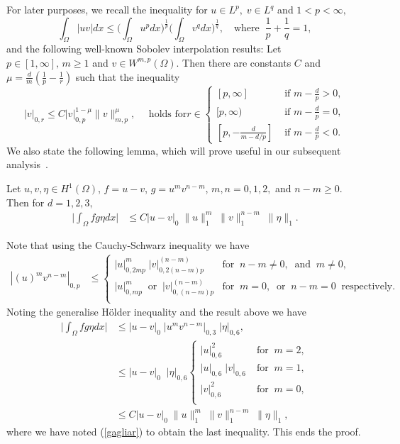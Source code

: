 For later purposes, we recall the \holder inequality for $u\in L^p,\; v\in L^q$
and $1<p<\infty,$
\begin{equation}
\int_\Omega |uv| dx \leq \bigg(\int_\Omega u^p dx\bigg)^{\frac{1}{p}}\bigg(
\int_\Omega v^q dx \bigg)^{\frac{1}{q}},\quad\mbox{where}\;\; \frac{1}{p}+\frac{1}{q}=1,\label{Holder}
\end{equation}
and the following well-known Sobolev
interpolation results: Let $p \in
[1,\infty],\, m \geq 1$ and $v \in W^{m,p}(\Omega)$.  Then
there are constants $C$ and $\mu=
\frac{d}{m}\left(\frac{1}{p}-\frac{1}{r}  \right )$ such that the
inequality
\begin{equation}
|v|_{0,r} \leq C|v|^{1-\mu}_{0,p} \|v\|^\mu_{m,p},\quad \mbox{ holds for
} 
r\in 
\begin{cases}
        \mbox{$[p,\infty]$}&  \mbox{ if }  m-\frac{d}{p} > 0,\\
        \mbox{$[p,\infty)$} &\mbox{ if } m-\frac{d}{p} = 0,\\
        \mbox{$[p,-\frac{d}{ m-d/p}]$}& \mbox{ if } m-\frac{d}{p} < 0.
\end{cases}\label{gagliar}
\end{equation}
We also state the following lemma, which will prove useful
in our subsequent analysis~\cite{BB}.

\begin{Lem}\label{Lem201}
Let $u,v,\eta \in H^1{(\Omega)}$, $f=u-v$, $g=u^m v^{n-m}$, $m,n=0,1,2,$ and $n-m\geq
0$. Then for $d=1,2,3,$
\begin{align}
\bigg| \int_\Omega f g \eta dx \bigg| &\leq C |u-v|_0\; \|u\|_1^m\; \|v\|_1^{n-m}\; \|\eta\|_1.
\label{2le000}
\end{align}
\end{Lem}
\bproof
Note that using the Cauchy-Schwarz inequality we have
\begin{align*}
|(u)^m v^{n-m}|_{0,p}&\leq
\begin{cases}
|u|_{0,2mp}^m \;|v|_{0,2(n-m)p}^{(n-m)}&\mbox{for}\;\;
 n-m\neq 0,\;\;\mbox{and}\;\; m\neq 0,\\
|u|_{0,mp}^m \;\;\mbox{or}\;\;|v|_{0,(n-m)p}^{(n-m)}&\mbox{for}\;\;
 m= 0,\;\;\mbox{or}\;\; n-m= 0\;\;\mbox{respectively}.\\
\end{cases}
\end{align*}
Noting the  generalise H\"older inequality  and the result above we have
\begin{align*}
\bigg| \int_\Omega f g \eta dx \bigg| 
&\leq |u-v|_0\;|u^m v^{n-m}|_{0,3}\;|\eta|_{0,6},\\
&\leq |u-v|_0\;\;|\eta|_{0,6}
\begin{cases}
|u|_{0,6}^2\;&\mbox{for}\;\;m=2,\\
|u|_{0,6}\;|v|_{0,6} \;&\mbox{for}\;\;m=1,\\
|v|_{0,6}^2 \;&\mbox{for}\;\;m=0,\\
\end{cases}\\
&\leq C |u-v|_0\; \|u\|_1^m\; \|v\|_1^{n-m}\; \|\eta\|_1,
\end{align*}
where we have noted (\ref{gagliar}) to obtain the last inequality.
This ends the proof.\eproof

